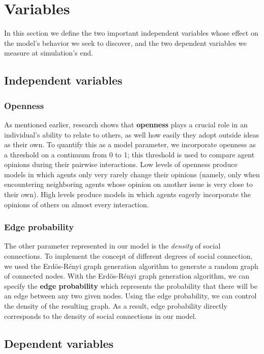 
\section{Variables}

In this section we define the two important independent variables whose effect
on the model's behavior we seek to discover, and the two dependent variables we
measure at simulation's end.

\subsection{Independent variables}

\subsubsection{Openness}

As mentioned earlier, research shows that \textbf{openness} plays a crucial role in an
individual's ability to relate to others, as well how easily they adopt outside
ideas as their own. To quantify this as a model parameter, we incorporate
openness as a threshold on a continuum from 0 to 1; this threshold is used to
compare agent opinions during their pairwise interactions. Low levels of
openness produce models in which agents only very rarely change their opinions
(namely, only when encountering neighboring agents whose opinion on another
issue is very close to their own). High levels produce models in which agents
eagerly incorporate the opinions of others on almost every interaction.

\subsubsection{Edge probability}

The other parameter represented in our model is the \textit{density} of social
connections. To implement the concept of different degrees of social
connection, we used the Erd\"{o}s-R\'{e}nyi graph generation algorithm to
generate a random graph of connected nodes. With the Erd\"{o}s-R\'{e}nyi graph
generation algorithm, we can specify the \textbf{edge probability} which represents the
probability that there will be an edge between any two given nodes. Using the
edge probability, we can control the density of the resulting graph. As a
result, edge probability directly corresponds to the density of social
connections in our model.    

\subsection{Dependent variables}


